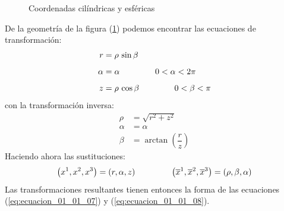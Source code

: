 \documentclass[hidelinks,12pt]{article}
\begin{document}
\begin{figure}[H]
\caption{Coordenadas cilíndricas y esféricas}
\label{fig:figura_01_01_05}
\end{figure}
De la geometría de la figura (\ref{fig:figura_01_01_05}) podemos encontrar las ecuaciones de transformación:
\begin{align*}
r &= \rho \, \sin \beta \\[0.5em]
\alpha &= \alpha \hspace{1.5cm} 0 < \alpha < 2 \pi \\[0.5em]
z &= \rho \, \cos \beta \hspace{1.5cm} 0 < \beta < \pi
\end{align*}
con la transformación inversa:
\begin{align*}
\rho &= \sqrt{r^{2} + z^{2}} \\[0.5em]
\alpha &= \alpha \\[0.5em]
\beta &= \arctan \left( \dfrac{r}{z} \right)
\end{align*}
Haciendo ahora las sustituciones:
\begin{align*}
\left( x^{1}, x^{2}, x^{3} \right) = \left( r, \alpha, z \right) \hspace{1.5cm} \left( \overline{x}^{1}, \overline{x}^{2}, \overline{x}^{3} \right) = \left( \rho, \beta, \alpha \right)
\end{align*}
Las transformaciones resultantes tienen entonces la forma de las ecuaciones (\ref{eq:ecuacion_01_01_07}) y (\ref{eq:ecuacion_01_01_08}).
\end{document}
